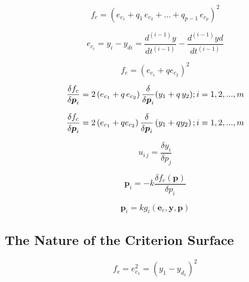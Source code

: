 \documentclass[12pt,reqno]{article}
\newcommand{\vect}[1]{\boldsymbol{#1}} %
\begin{document}
\begin{equation}
    f_c = {\left(e_{c_1} + q_1 \, e_{c_2} + ... + q_{p-1} \, e_{c_p}\right)}^2
\end{equation}

\begin{equation}
    e_{c_i} = y_i - y_{di} = \frac{d^{(i-1)} y}{dt^{(i-1)}} - \frac{d^{(i-1)} y d}{dt^{(i-1)}}
\end{equation}

\begin{equation}
    f_c = {\left(e_{c_1} + qe_{c_2}\right)}^2
\end{equation}

\begin{equation}
    \frac{\delta f_c}{\delta \vect{p}_i} = 2\left(e_{c_1} + q \, e_{c_2}\right) \frac{\delta}{\delta \vect{p}_i}(y_1 + q \, y_2); \\
    i = 1,2,...,m
\end{equation} %

\begin{equation}
    \frac{\delta f_c}{\delta \vect{p}_i} = 2\left(e_{c_1} + qe_{c_2}\right) \frac{\delta}{\delta \vect{p}_i}\left(y_1 + qy_2\right);\\
    i = 1,2,...,m
\end{equation}

\begin{equation}
    u_{i \, j} = \frac{\delta y_i}{\delta p_j}
\end{equation}

\begin{equation}
    \vect{p}_i = -k \frac{\delta f_c\left(\vect{p}\right)}{\delta p_i}
\end{equation}

\begin{equation}
    \vect{p}_i = k g_i\left(\vect{e}_c, \vect{y}, \vect{p}\right)
\end{equation}




\subsection{The Nature of the Criterion Surface}

\begin{equation} 
    f_c = e^2_{c_1} = {\left( y_1 - y_{d_1}\right)}^2
\end{equation}
\end{document}

